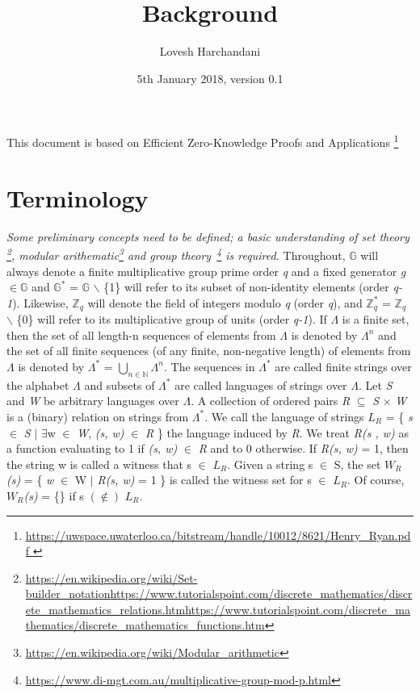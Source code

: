 \documentclass[a4paper]{article}
\title{Background}
\author{Lovesh Harchandani}
\date{5th January 2018, version 0.1}
\begin{document}
\maketitle

This document is based on Efficient Zero-Knowledge Proofs and Applications \footnote{\url{https://uwspace.uwaterloo.ca/bitstream/handle/10012/8621/Henry_Ryan.pdf
}}
 

\section{Terminology}

\textit{Some preliminary concepts need to be defined; a basic understanding of set theory \footnote{\url{https://en.wikipedia.org/wiki/Set-builder_notation}\newline \url{https://www.tutorialspoint.com/discrete_mathematics/discrete_mathematics_relations.htm}\newline \url{https://www.tutorialspoint.com/discrete_mathematics/discrete_mathematics_functions.htm}}, modular arithematic\footnote{\url{https://en.wikipedia.org/wiki/Modular_arithmetic}} and group theory~\footnote{\url{https://www.di-mgt.com.au/multiplicative-group-mod-p.html}} is required.} 
\newline
Throughout, $\mathbb{G}$ will always denote a finite multiplicative group prime order \emph{q} and a fixed generator \emph{g}\(\in\)$\mathbb{G}$ and $\mathbb{G}^{*}$ = $\mathbb{G}$ \ensuremath{\backslash} \{1\} will refer to its subset of non-identity elements (order \emph{q-1}). Likewise, $\mathbb{Z}_q$ will denote the field of integers modulo \emph{q} (order \emph{q}), and $\mathbb{Z}^{*}_q$ = $\mathbb{Z}_q$ \ensuremath{\backslash} \{0\} will refer to its multiplicative group of units (order \emph{q-1}).
\newline
\newline
If \(\Lambda\) is a finite set, then the set of all length-n sequences of elements from \(\Lambda\) is denoted by \(\Lambda^n\) and the set of all finite sequences (of any finite, non-negative length) of elements from \(\Lambda\) is denoted by \(\Lambda^{*}\) = \( \bigcup_{n\in\mathbb{N}} \)\(\Lambda^n\). The sequences in \(\Lambda^{*}\) are called finite strings over the alphabet \(\Lambda\) and subsets of \(\Lambda^{*}\) are called languages of strings over \(\Lambda\). Let \textit{S} and \textit{W} be arbitrary languages over \(\Lambda\). A collection of ordered pairs \textit{R} \(\subseteq\) \textit{S} \(\times\) \textit{W} is a (binary) relation on strings from \(\Lambda^{*}\). We call the language of strings \textit{$L_R$} {=} \{ \textit{s} $\in$ \textit{S} \(\mid\) \(\exists\)w $\in$ \textit{W}, \textit{(s, w)} $\in$ \textit{R} \} the language induced by \textit{R}. We treat \textit{R(s , w)} as a function evaluating to 1 if \textit{(s, w)} $\in$ \textit{R} and to 0 otherwise. If \textit{R(s, w)} = 1, then the string w is called a witness that s $\in$ \textit{$L_R$}. Given a string s $\in$ S, the set \textit{$W_R$(s)} = \{ \textit{w} $\in$ W $\mid$ \textit{R(s, w)} = 1 \}  is called the witness set for s $\in$ \textit{$L_R$}. Of course, \textit{$W_R$(s)} = \{\} if s $(\notin)$ \textit{$L_R$}.
\end{document}

